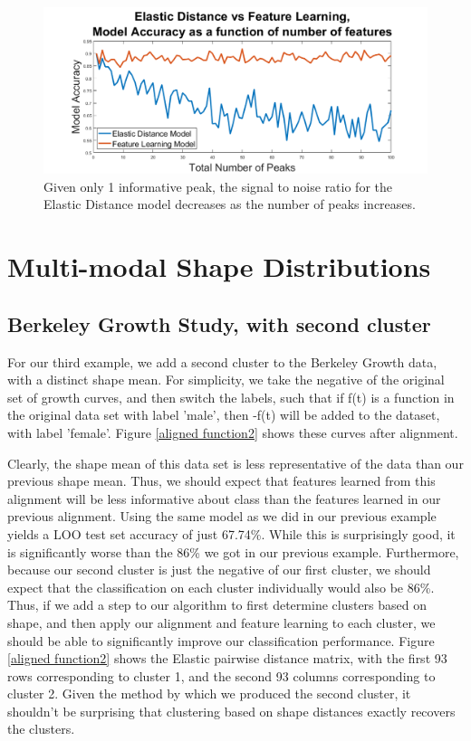 \documentclass[]{article}
\begin{document}
	\begin{figure}
		\includegraphics[width = \linewidth]{./simulated_model_compare.png}
		\caption{Given only 1 informative peak, the signal to noise ratio for the Elastic Distance model decreases as the number of peaks increases.}
		\label{simulated data compare}
	\end{figure}



\section{Multi-modal Shape Distributions}

\subsection{Berkeley Growth Study, with second cluster}

For our third example, we add a second cluster to the Berkeley Growth data, with a distinct shape mean. For simplicity, we take the negative of the original set of growth curves, and then switch the labels, such that if f(t) is a function in the original data set with label 'male', then -f(t) will be added to the dataset, with label 'female'. Figure \ref{aligned function2} shows these curves after alignment. 

Clearly, the shape mean of this data set is less representative of the data than our previous shape mean. Thus, we should expect that features learned from this alignment will be less informative about class than the features learned in our previous alignment. Using the same model as we did in our previous example yields a LOO test set accuracy of just 67.74\%. While this is surprisingly good, it is significantly worse than the 86\% we got in our previous example. Furthermore, because our second cluster is just the negative of our first cluster, we should expect that the classification on each cluster individually would also be 86\%. Thus, if we add a step to our algorithm to first determine clusters based on shape, and then apply our alignment and feature learning to each cluster, we should be able to significantly improve our classification performance. Figure \ref{aligned function2} shows the Elastic pairwise distance matrix, with the first 93 rows corresponding to cluster 1, and the second 93 columns corresponding to cluster 2. Given the method by which we produced the second cluster, it shouldn't be surprising that clustering based on shape distances exactly recovers the clusters. \\
\end{document}
